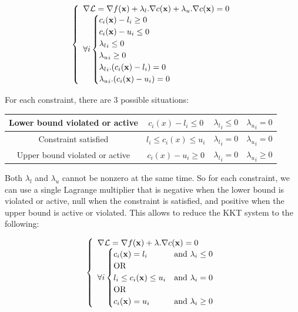 \begin{equation}
\label{KKT}
\left\{
\begin{array}{lr}
  \nabla \mathcal{L} = \nabla f({\bf x}) + \lambda_l.\nabla c({\bf x}) + \lambda_u.\nabla
c({\bf x}) = 0 \\
  \forall i
  \begin{cases}
  c_i({\bf x}) - l_i \geq 0 \\
  c_i({\bf x}) - u_i \leq 0 \\
  {\lambda_l}_i \leq 0 \\
  {\lambda_u}_i \geq 0 \\
  {\lambda_l}_i.(c_i({\bf x})-l_i) = 0 \\
  {\lambda_u}_i.(c_i({\bf x})-u_i) = 0
  \end{cases}
\end{array}
\right.
\end{equation}

For each constraint, there are 3 possible situations:

\begin{tabular}{cccc}
  \toprule
  Lower bound violated or active & $c_i(x)-l_i\leq0$ & ${\lambda_l}_i\leq0$ & ${\lambda_u}_i=0$ \\
  \midrule
  Constraint satisfied & $l_i\leq c_i(x) \leq u_i$ & ${\lambda_l}_i=0$ & ${\lambda_u}_i=0$ \\
  \midrule
  Upper bound violated or active & $c_i(x)-u_i\geq0$ & ${\lambda_l}_i=0$ & ${\lambda_u}_i\geq0$ \\
  \bottomrule
\end{tabular}

Both $\lambda_l$ and $\lambda_u$ cannot be nonzero at the same time. So for each constraint, we can use a single Lagrange multiplier that is negative when the lower bound is violated or active, null when the constraint is satisfied, and positive when the upper bound is active or violated.
This allows to reduce the KKT system to the following:

\begin{equation}
\label{KKTmodified}
\left\{
\begin{array}{lr}
  \nabla \mathcal{L} = \nabla f({\bf x}) + \lambda.\nabla c({\bf x}) = 0 \\
  \forall i
  \begin{cases}
  c_i({\bf x}) = l_i & \text{and } \lambda_i \leq 0 \\
  \text{OR}\\
  l_i \leq c_i({\bf x}) \leq u_i & \text{and } \lambda_i = 0 \\
  \text{OR}\\
  c_i({\bf x}) = u_i & \text{and } \lambda_i \geq 0
  \end{cases}
\end{array}
\right.
\end{equation}

